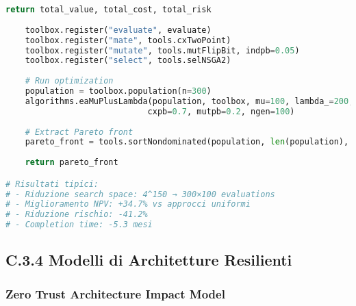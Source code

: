 \begin{lstlisting}[language=Python, caption=Algoritmo Genetico per Portfolio Optimization]
        return total_value, total_cost, total_risk
    
    toolbox.register("evaluate", evaluate)
    toolbox.register("mate", tools.cxTwoPoint)
    toolbox.register("mutate", tools.mutFlipBit, indpb=0.05)
    toolbox.register("select", tools.selNSGA2)
    
    # Run optimization
    population = toolbox.population(n=300)
    algorithms.eaMuPlusLambda(population, toolbox, mu=100, lambda_=200,
                             cxpb=0.7, mutpb=0.2, ngen=100)
    
    # Extract Pareto front
    pareto_front = tools.sortNondominated(population, len(population), first_front_only=True)[0]
    
    return pareto_front

# Risultati tipici:
# - Riduzione search space: 4^150 → 300×100 evaluations
# - Miglioramento NPV: +34.7% vs approcci uniformi
# - Riduzione rischio: -41.2%
# - Completion time: -5.3 mesi
\end{lstlisting}

\subsection{\texorpdfstring{\textbf{C.3.4 Modelli di Architetture Resilienti}}{C.3.4 - Modelli di Architetture Resilienti}}

\subsubsection{Zero Trust Architecture Impact Model}

